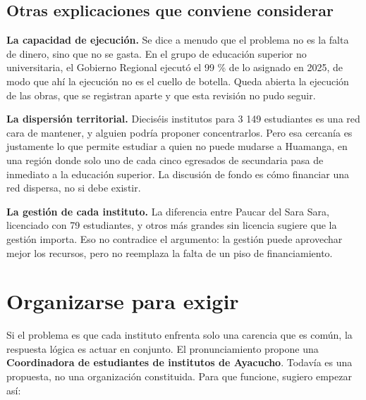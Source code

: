 \documentclass[
  jou,
  floatsintext,
  longtable,
  a4paper,
  nolmodern,
  notxfonts,
  notimes,
  12pt,
  colorlinks=true,linkcolor=blue,citecolor=blue,urlcolor=blue]{apa7}
\begin{document}
\subsection{Otras explicaciones que conviene
considerar}\label{otras-explicaciones-que-conviene-considerar}

\textbf{La capacidad de ejecución.} Se dice a menudo que el problema no
es la falta de dinero, sino que no se gasta. En el grupo de educación
superior no universitaria, el Gobierno Regional ejecutó el 99 \% de lo
asignado en 2025, de modo que ahí la ejecución no es el cuello de
botella. Queda abierta la ejecución de las obras, que se registran
aparte y que esta revisión no pudo seguir.

\textbf{La dispersión territorial.} Dieciséis institutos para 3 149
estudiantes es una red cara de mantener, y alguien podría proponer
concentrarlos. Pero esa cercanía es justamente lo que permite estudiar a
quien no puede mudarse a Huamanga, en una región donde solo uno de cada
cinco egresados de secundaria pasa de inmediato a la educación superior.
La discusión de fondo es cómo financiar una red dispersa, no si debe
existir.

\textbf{La gestión de cada instituto.} La diferencia entre Paucar del
Sara Sara, licenciado con 79 estudiantes, y otros más grandes sin
licencia sugiere que la gestión importa. Eso no contradice el argumento:
la gestión puede aprovechar mejor los recursos, pero no reemplaza la
falta de un piso de financiamiento.

\section{Organizarse para exigir}\label{organizarse-para-exigir}

Si el problema es que cada instituto enfrenta solo una carencia que es
común, la respuesta lógica es actuar en conjunto. El pronunciamiento
propone una \textbf{Coordinadora de estudiantes de institutos de
Ayacucho}. Todavía es una propuesta, no una organización constituida.
Para que funcione, sugiero empezar así:
\end{document}
